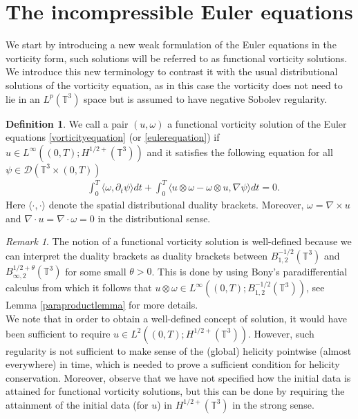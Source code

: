 \documentclass[12pt,a4paper]{article}
\theoremstyle{definition}
\newtheorem{definition}[theorem]{Definition}
\theoremstyle{remark}
\newtheorem{remark}[theorem]{Remark}
\numberwithin{equation}{section}
\begin{document}
\section{The incompressible Euler equations} \label{eulersection}
We start by introducing a new weak formulation of the Euler equations in the vorticity form, such solutions will be referred to as functional vorticity solutions. We introduce this new terminology to contrast it with the usual distributional solutions of the vorticity equation, as in this case the vorticity does not need to lie in an $L^p (\mathbb{T}^3)$ space but is assumed to have negative Sobolev regularity.
\begin{definition} \label{functionalvorticity}
We call a pair $(u, \omega)$ a functional vorticity solution of the Euler equations \eqref{vorticityequation} (or \eqref{eulerequation}) if $u \in L^\infty ((0,T) ; H^{1/2+} (\mathbb{T}^3))$ and it satisfies the following equation for all $\psi \in \mathcal{D} ( \mathbb{T}^3 \times (0,T))$
\begin{align} \label{functionalvorticityeq}
&\int_0^T \langle \omega, \partial_t \psi \rangle dt + \int_0^T \big\langle u \otimes \omega - \omega \otimes u , \nabla \psi \big\rangle dt = 0. 
\end{align}
Here $\langle \cdot, \cdot \rangle$ denote the spatial distributional duality brackets. Moreover, $\omega = \nabla \times u$ and $\nabla \cdot u = \nabla \cdot \omega = 0$ in the distributional sense. 
\end{definition}
\begin{remark}
The notion of a functional vorticity solution is well-defined because we can interpret the duality brackets as duality brackets between $B^{-1/2}_{1,2} (\mathbb{T}^3)$ and $B^{1/2+\theta}_{\infty,2} (\mathbb{T}^3)$ for some small $\theta > 0$. This is done by using Bony's paradifferential calculus from which it follows that $u \otimes \omega \in L^\infty ((0,T); B^{-1/2}_{1,2} (\mathbb{T}^3))$, see Lemma \ref{paraproductlemma} for more details. \\
We note that in order to obtain a well-defined concept of solution, it would have been sufficient to require $u \in L^2 ((0,T); H^{1/2+} (\mathbb{T}^3))$. However, such regularity is not sufficient to make sense of the (global) helicity pointwise (almost everywhere) in time, which is needed to prove a sufficient condition for helicity conservation. Moreover, observe that we have not specified how the initial data is attained for functional vorticity solutions, but this can be done by requiring the attainment of the initial data (for $u$) in $H^{1/2+} (\mathbb{T}^3)$ in the strong sense.
\end{remark}
\end{document}
